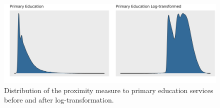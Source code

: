\documentclass[11pt, a4paper]{article}
\begin{document}
\begin{figure}[H]
\centering
\includegraphics[width=\textwidth]{./distributions/compare_distributions.png}
\caption[Comparison of distributions]{Distribution of the proximity measure to primary education services before and after log-transformation.}\label{comparedist}
\end{figure}
\end{document}
